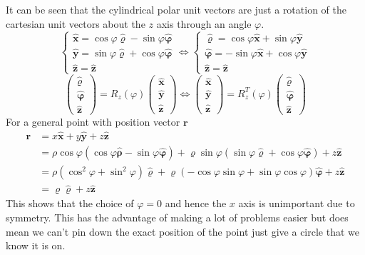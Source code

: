 \documentclass{article}
\newcommand{\vh}[1]{\vec{\hat{#1}}}
\renewcommand{\vec}[1]{\bm{#1}}
\newcommand{\vv}[1]{\vec{#1}}
\begin{document}
It can be seen that the cylindrical polar unit vectors are just a rotation of the cartesian unit vectors about the \(z\) axis through an angle \(\varphi\).
\[\left\{
\begin{array}{l}
\vh x = \cos\varphi\vh\varrho-\sin\varphi\vh\varphi\\
\vh y = \sin\varphi\vh\varrho+\cos\varphi\vh\varphi\\
\vh z = \vh z
\end{array}
\right.\iff\left\{
\begin{array}{l}
\vh\varrho = \cos\varphi\vh x+\sin\varphi\vh y\\
\vh\varphi = -\sin\varphi\vh x+\cos\varphi\vh y\\
\vh z = \vh z
\end{array}
\right.\]
\[
\begin{pmatrix}
\vh\varrho \\ \vh\varphi \\ \vh z
\end{pmatrix}
=R_z(\varphi)
\begin{pmatrix}
\vh x \\ \vh y \\ \vh z
\end{pmatrix}
\iff
\begin{pmatrix}
\vh x \\ \vh y \\ \vh z
\end{pmatrix}
=R_z^T(\varphi)
\begin{pmatrix}
\vh\varrho \\ \vh\varphi \\ \vh z
\end{pmatrix}
\]
For a general point with position vector \(\vv r\)
\begin{align*}
\vv r &= x\vh x+y\vh y+z\vh z\\
&= \rho\cos\varphi(\cos\varphi\vh\rho-\sin\varphi\vh\varphi)+\varrho\sin\varphi(\sin\varphi\vh\varrho+\cos\varphi\vh\varphi)+z\vh z\\
&= \rho(\cos^2\varphi+\sin^2\varphi)\vh\varrho+\varrho(-\cos\varphi\sin\varphi+\sin\varphi\cos\varphi)\vh\varphi+z\vh z\\
&= \varrho\vh\varrho+z\vh z
\end{align*}
This shows that the choice of \(\varphi=0\) and hence the \(x\) axis is unimportant due to symmetry. This has the advantage of making a lot of problems easier but does mean we can't pin down the exact position of the point just give a circle that we know it is on.
\end{document}
